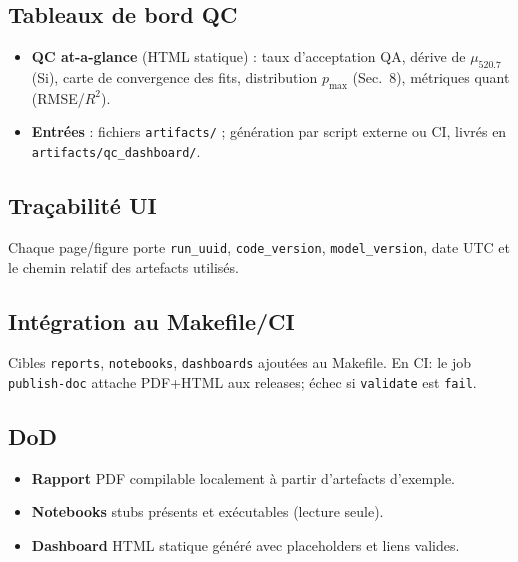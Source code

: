 \subsection{Tableaux de bord QC}
\begin{itemize}[nosep]
\item \textbf{QC at-a-glance} (HTML statique) : taux d'acceptation QA, dérive de $\mu_{520.7}$ (Si), carte de convergence des fits, distribution $p_{\max}$ (Sec.~8), métriques quant (RMSE/$R^2$).
\item \textbf{Entrées} : fichiers \texttt{artifacts/} ; génération par script externe ou CI, livrés en \texttt{artifacts/qc\_dashboard/}.
\end{itemize}

\subsection{Traçabilité UI}
Chaque page/figure porte \texttt{run\_uuid}, \texttt{code\_version}, \texttt{model\_version}, date UTC et le chemin relatif des artefacts utilisés.

\subsection{Intégration au Makefile/CI}
Cibles \texttt{reports}, \texttt{notebooks}, \texttt{dashboards} ajoutées au Makefile. En CI: le job \texttt{publish-doc} attache PDF+HTML aux releases; échec si \texttt{validate} est \texttt{fail}.

\subsection{DoD}
\begin{itemize}[nosep]
\item \textbf{Rapport} PDF compilable localement à partir d'artefacts d'exemple.
\item \textbf{Notebooks} stubs présents et exécutables (lecture seule).
\item \textbf{Dashboard} HTML statique généré avec placeholders et liens valides.
\end{itemize}

